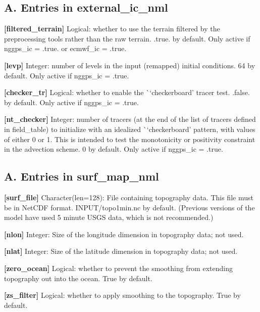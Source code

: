 \subsection*{A. Entries in external\+\_\+ic\+\_\+nml}

{\bfseries \mbox{[}filtered\+\_\+terrain\mbox{]}} Logical\+: whether to use the terrain filtered by the preprocessing tools rather than the raw terrain. .true. by default. Only active if nggps\+\_\+ic = .true. or ecmwf\+\_\+ic = .true.

{\bfseries \mbox{[}levp\mbox{]}} Integer\+: number of levels in the input (remapped) initial conditions. 64 by default. Only active if nggps\+\_\+ic = .true.

{\bfseries \mbox{[}checker\+\_\+tr\mbox{]}} Logical\+: whether to enable the \`{}`checkerboard'\textquotesingle{} tracer test. .false. by default. Only active if nggps\+\_\+ic = .true.

{\bfseries \mbox{[}nt\+\_\+checker\mbox{]}} Integer\+: number of tracers (at the end of the list of tracers defined in field\+\_\+table) to initialize with an idealized \`{}`checkerboard'\textquotesingle{} pattern, with values of either 0 or 1. This is intended to test the monotonicity or positivity constraint in the advection scheme. 0 by default. Only active if nggps\+\_\+ic = .true.

\subsection*{A. Entries in surf\+\_\+map\+\_\+nml}

{\bfseries \mbox{[}surf\+\_\+file\mbox{]}} Character(len=128)\+: File containing topography data. This file must be in Net\+C\+DF format. I\+N\+P\+U\+T/topo1min.\+nc by default. (Previous versions of the model have used 5 minute U\+S\+GS data, which is not recommended.)

{\bfseries \mbox{[}nlon\mbox{]}} Integer\+: Size of the longitude dimension in topography data; not used.

{\bfseries \mbox{[}nlat\mbox{]}} Integer\+: Size of the latitude dimension in topography data; not used.

{\bfseries \mbox{[}zero\+\_\+ocean\mbox{]}} Logical\+: whether to prevent the smoothing from extending topography out into the ocean. True by default.

{\bfseries \mbox{[}zs\+\_\+filter\mbox{]}} Logical\+: whether to apply smoothing to the topography. True by default.

